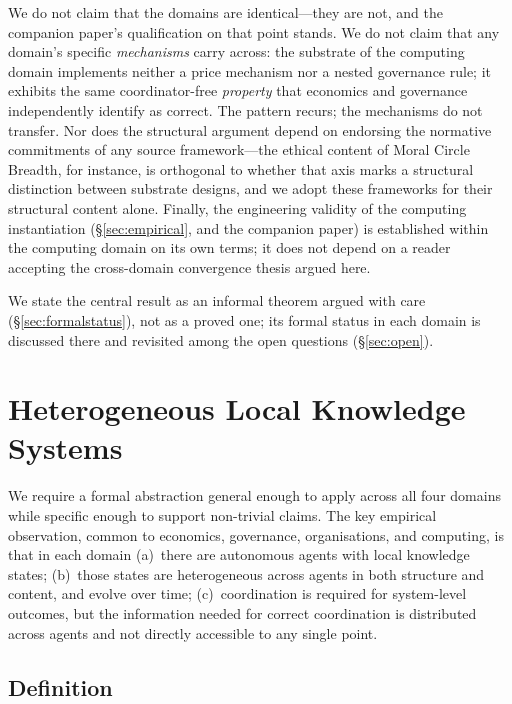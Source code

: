 \documentclass[11pt]{article}
\theoremstyle{definition}
\theoremstyle{plain}
\theoremstyle{plain}
\begin{document}
We do not claim that the domains are identical---they are not, and the companion
paper's qualification on that point stands. We do not claim that any domain's
specific \emph{mechanisms} carry across: the substrate of the computing domain
implements neither a price mechanism nor a nested governance rule; it exhibits the
same coordinator-free \emph{property} that economics and governance independently
identify as correct. The pattern recurs; the mechanisms do not transfer. Nor does
the structural argument depend on endorsing the normative commitments of any source
framework---the ethical content of Moral Circle Breadth, for instance, is
orthogonal to whether that axis marks a structural distinction between substrate
designs, and we adopt these frameworks for their structural content alone. Finally,
the engineering validity of the computing instantiation (\S\ref{sec:empirical}, and
the companion paper) is established within the computing domain on its own terms; it
does not depend on a reader accepting the cross-domain convergence thesis argued
here.

We state the central result as an informal theorem argued with care
(\S\ref{sec:formalstatus}), not as a proved one; its formal status in each domain is
discussed there and revisited among the open questions (\S\ref{sec:open}).

\section{Heterogeneous Local Knowledge Systems}
\label{sec:hlks}

We require a formal abstraction general enough to apply across all four
domains while specific enough to support non-trivial claims. The key empirical
observation, common to economics, governance, organisations, and computing, is
that in each domain (a)~there are autonomous agents with local knowledge
states; (b)~those states are heterogeneous across agents in both structure and
content, and evolve over time; (c)~coordination is required for system-level
outcomes, but the information needed for correct coordination is distributed
across agents and not directly accessible to any single point.

\subsection{Definition}
\end{document}

